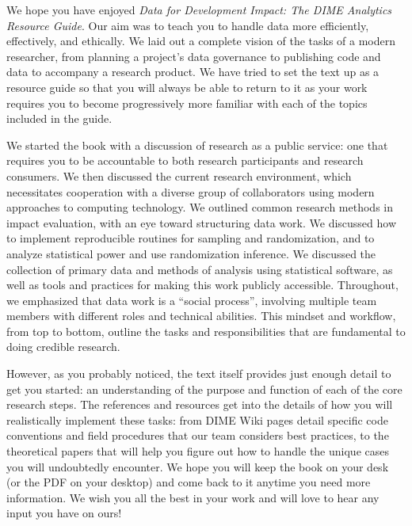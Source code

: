 We hope you have enjoyed \textit{Data for Development Impact: The DIME Analytics Resource Guide}.
Our aim was to teach you to handle data more efficiently, effectively, and ethically. 
We laid out a complete vision of the tasks of a modern researcher,
from planning a project's data governance to publishing code and data
to accompany a research product.
We have tried to set the text up as a resource guide
so that you will always be able to return to it
as your work requires you to become progressively more familiar
with each of the topics included in the guide.

We started the book with a discussion of research as a public service:
one that requires you to be accountable to both research participants
and research consumers.
We then discussed the current research environment,
which necessitates cooperation with a diverse group of collaborators
using modern approaches to computing technology.
We outlined common research methods in impact evaluation, 
with an eye toward structuring data work.
We discussed how to implement reproducible routines for sampling and randomization,
and to analyze statistical power and use randomization inference.
We discussed the collection of primary data
and methods of analysis using statistical software,
as well as tools and practices for making this work publicly accessible.
Throughout, we emphasized that data work is a ``social process'', 
involving multiple team members with different roles and technical abilities.  
This mindset and workflow, from top to bottom,
outline the tasks and responsibilities
that are fundamental to doing credible research. 

However, as you probably noticed, the text itself provides
just enough detail to get you started:
an understanding of the purpose and function of each of the core research steps.
The references and resources get into the details
of how you will realistically implement these tasks: 
from DIME Wiki pages detail specific code conventions 
and field procedures that our team considers best practices,
to the theoretical papers that will help you figure out
how to handle the unique cases you will undoubtedly encounter.
We hope you will keep the book on your desk
(or the PDF on your desktop)
and come back to it anytime you need more information.
We wish you all the best in your work
and will love to hear any input you have on ours!
